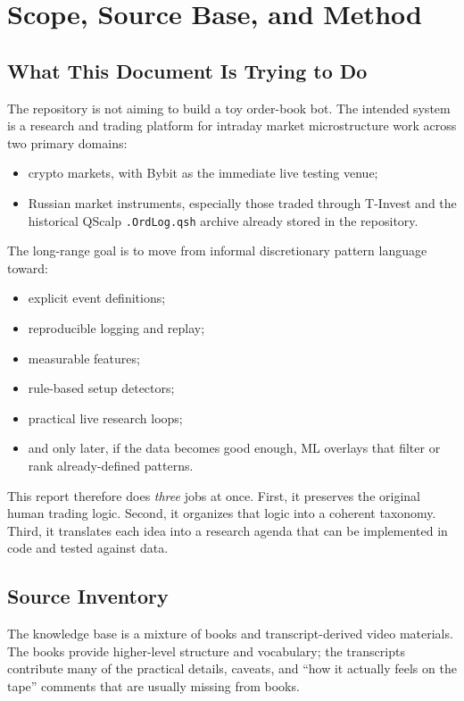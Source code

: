\section{Scope, Source Base, and Method}

\subsection{What This Document Is Trying to Do}

The repository is not aiming to build a toy order-book bot.
The intended system is a research and trading platform for intraday market microstructure work across two primary domains:
\begin{itemize}
  \item crypto markets, with Bybit as the immediate live testing venue;
  \item Russian market instruments, especially those traded through T-Invest and the historical QScalp \texttt{.OrdLog.qsh} archive already stored in the repository.
\end{itemize}

The long-range goal is to move from informal discretionary pattern language toward:
\begin{itemize}
  \item explicit event definitions;
  \item reproducible logging and replay;
  \item measurable features;
  \item rule-based setup detectors;
  \item practical live research loops;
  \item and only later, if the data becomes good enough, ML overlays that filter or rank already-defined patterns.
\end{itemize}

This report therefore does \emph{three} jobs at once.
First, it preserves the original human trading logic.
Second, it organizes that logic into a coherent taxonomy.
Third, it translates each idea into a research agenda that can be implemented in code and tested against data.

\subsection{Source Inventory}

The knowledge base is a mixture of books and transcript-derived video materials.
The books provide higher-level structure and vocabulary; the transcripts contribute many of the practical details, caveats, and ``how it actually feels on the tape'' comments that are usually missing from books.

